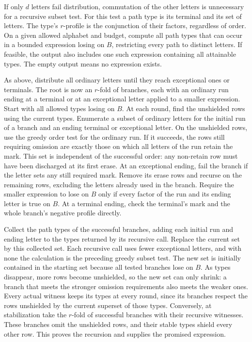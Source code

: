 If only $d$ letters fail distribution, commutation of
the other letters is unnecessary for a recursive subset
test. For this test a path type is its terminal and its
set of letters. The type's $r$-profile is the
conjunction of their factors, regardless of order. On
a given allowed alphabet and budget, compute all path
types that can occur in a bounded expression losing
on $B$, restricting every path to distinct letters.
If feasible, the output also includes one such expression
containing all attainable types. The empty output means
no expression exists.

As above, distribute all ordinary letters until they
reach exceptional ones or terminals. The root is now
an $r$-fold of branches, each with an ordinary run
ending at a terminal or at an exceptional letter
applied to a smaller expression. Start with all allowed
types losing on $B$. At each round, find the unshielded
rows using the current types. Enumerate a subset of
ordinary letters for the initial run of a branch and
an ending terminal or exceptional letter. On the
unshielded rows, use the greedy order test for the
ordinary run. If it succeeds, the rows still requiring
omission are exactly those on which all letters of
the run retain the mark. This set is independent of
the successful order: any non-retain row must have
been discharged at its first erase. At an exceptional
ending, fail the branch if the letter sets any still
required mark. Remove its erase rows and recurse on
the remaining rows, excluding the letters already
used in the branch. Require the smaller expression
to lose on $B$ only if every factor of the run and
its ending letter is true on $B$. At a terminal ending,
check the terminal's mark and the whole branch's
negative profile directly.

Collect the path types of the successful branches,
adding each initial run and ending letter to the
types returned by its recursive call. Replace the
current set by this collected set. Each recursive
call uses fewer exceptional letters, and with none
the calculation is the preceding greedy subset test.
The new set is initially contained in the starting
set because all tested branches lose on $B$. As
types disappear, more rows become unshielded, so
the new set can only shrink: a branch that meets
the stronger omission requirements also meets the
weaker ones. Every actual witness keeps its types
at every round, since its branches respect the rows
unshielded by the current superset of those types.
Conversely, at stabilization take the $r$-fold of
successful branches with their recursive witnesses.
These branches omit the unshielded rows, and their
stable types shield every other row. This proves the
recursion and supplies the promised expression.

